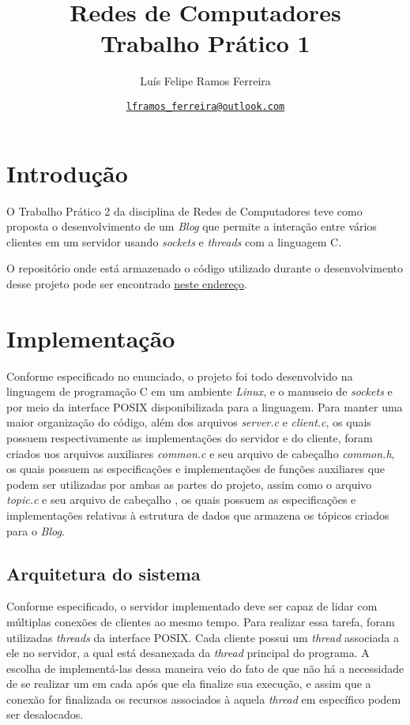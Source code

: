 \documentclass{article}
\title{Redes de Computadores \\ \large Trabalho Prático 1}
\author{Luís Felipe Ramos Ferreira}
\date{\href{mailto:lframos\_ferreira@outlook.com}{\texttt{lframos\_ferreira@outlook.com}}
}
\begin{document}
\maketitle

\section{Introdução}

O Trabalho Prático 2 da disciplina de Redes de Computadores teve como proposta
o desenvolvimento de um \textit{Blog} que permite a interação entre vários
clientes em um servidor usando \textit{sockets} e \textit{threads} com a linguagem C.

O repositório onde está armazenado o código utilizado durante o desenvolvimento
desse projeto
pode ser encontrado \href{https://github.com/lframosferreira/tp2-redes}{neste
      endereço}.

\section{Implementação}

Conforme especificado no enunciado, o projeto foi todo desenvolvido na
linguagem de programação C em um ambiente \textit{Linux}, e o manuseio de
\textit{sockets} e  por
meio da interface POSIX
disponibilizada para a linguagem. Para manter uma maior organização do código,
além dos arquivos \textit{server.c} e \textit{client.c}, os quais possuem
respectivamente as implementações do servidor e do cliente,
foram criados uos arquivos auxiliares \textit{common.c} e seu arquivo de cabeçalho
\textit{common.h}, os quais possuem as especificações e implementações de
funções auxiliares que podem ser utilizadas por ambas as partes do projeto, assim como o arquivo \textit{topic.c} e seu arquivo de cabeçalho ,
os quais possuem as especificações e implementações relativas à estrutura de dados que armazena os tópicos criados para o \textit{Blog}.

\subsection{Arquitetura do sistema}

Conforme especificado, o servidor implementado deve ser capaz de lidar com múltiplas conexões de clientes ao mesmo tempo. Para realizar essa tarefa,
foram utilizadas \textit{threads} da interface POSIX. Cada cliente possui um \textit{thread} associada a ele no servidor, a qual está desanexada da \textit{thread}
principal do programa. A escolha de implementá-las dessa maneira veio do fato de que não há a necessidade de se realizar um  em cada  após que ela finalize sua execução, e assim
que a conexão for finalizada os recursos associados à aquela \textit{thread} em específico podem ser desalocados.
\end{document}
